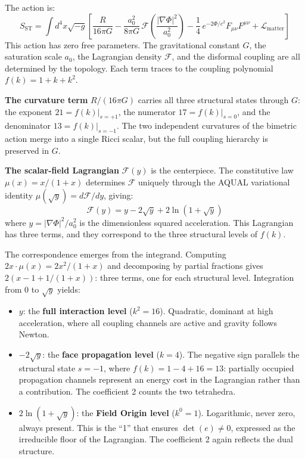 \documentclass[aps,prd,preprint,superscriptaddress,showpacs,preprintnumbers,amsmath,amssymb,nofootinbib]{revtex4-2}
\begin{document}
The action is:
\begin{equation}
S_{\text{ST}} = \int d^4x \sqrt{-g} \left[ \frac{R}{16\pi G} - \frac{a_0^2}{8\pi G}\,\mathcal{F}\!\left(\frac{|\nabla\Phi|^2}{a_0^2}\right) - \frac{1}{4}\,e^{-2\Phi/c^2} F_{\mu\nu}F^{\mu\nu} + \mathcal{L}_{\text{matter}} \right]
\label{eq:scalar-tensor}
\end{equation}
This action has zero free parameters. The gravitational constant $G$, the saturation scale $a_0$, the Lagrangian density $\mathcal{F}$, and the disformal coupling are all determined by the topology. Each term traces to the coupling polynomial $f(k) = 1 + k + k^2$.

\textbf{The curvature term} $R/(16\pi G)$ carries all three structural states through $G$: the exponent $21 = f(k)|_{s=+1}$, the numerator $17 = f(k)|_{s=0}$, and the denominator $13 = f(k)|_{s=-1}$. The two independent curvatures of the bimetric action merge into a single Ricci scalar, but the full coupling hierarchy is preserved in $G$.

\textbf{The scalar-field Lagrangian} $\mathcal{F}(y)$ is the centerpiece. The constitutive law $\mu(x) = x/(1+x)$ determines $\mathcal{F}$ uniquely through the AQUAL variational identity $\mu(\sqrt{y}) = d\mathcal{F}/dy$, giving:
\begin{equation}
\mathcal{F}(y) = y - 2\sqrt{y} + 2\ln(1 + \sqrt{y})
\label{eq:aqual-lagrangian}
\end{equation}
where $y = |\nabla\Phi|^2/a_0^2$ is the dimensionless squared acceleration. This Lagrangian has three terms, and they correspond to the three structural levels of $f(k)$.

The correspondence emerges from the integrand. Computing $2x \cdot \mu(x) = 2x^2/(1+x)$ and decomposing by partial fractions gives $2(x - 1 + 1/(1+x))$: three terms, one for each structural level. Integration from $0$ to $\sqrt{y}$ yields:
\begin{itemize}
\item $y$: the \textbf{full interaction level} ($k^2 = 16$). Quadratic, dominant at high acceleration, where all coupling channels are active and gravity follows Newton.
\item $-2\sqrt{y}$: the \textbf{face propagation level} ($k = 4$). The negative sign parallels the structural state $s = -1$, where $f(k) = 1 - 4 + 16 = 13$: partially occupied propagation channels represent an energy cost in the Lagrangian rather than a contribution. The coefficient 2 counts the two tetrahedra.
\item $2\ln(1 + \sqrt{y})$: the \textbf{Field Origin level} ($k^0 = 1$). Logarithmic, never zero, always present. This is the ``1'' that ensures $\det(e) \neq 0$, expressed as the irreducible floor of the Lagrangian. The coefficient 2 again reflects the dual structure.
\end{itemize}
\end{document}

